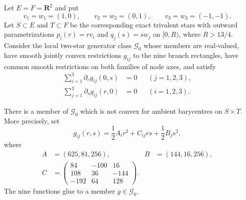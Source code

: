 
\begin{proposition}
\label{prop:p071-offcenter-convex-roof-obstruction}
Let $E=F=\mathbf R^2$ and put
\[
 v_1=w_1=(1,0),\qquad
 v_2=w_2=(0,1),\qquad
 v_3=w_3=(-1,-1).
\]
Let $S\subset E$ and $T\subset F$ be the corresponding exact trivalent
stars with outward parametrizations $p_i(r)=rv_i$ and $q_j(s)=sw_j$ on
$[0,R)$, where $R>13/4$.  Consider the local two-star generator class
$\mathcal G_0$ whose members are real-valued, have smooth jointly convex
restrictions $g_{ij}$ to the nine branch rectangles, have common smooth
restrictions on both families of node axes, and satisfy
\begin{align}
 \sum_{i=1}^3\partial_rg_{ij}(0,s)&=0
       &&(j=1,2,3),
 \label{eq:p071-offcenter-first-balance}\\
 \sum_{j=1}^3\partial_sg_{ij}(r,0)&=0
       &&(i=1,2,3).
 \label{eq:p071-offcenter-second-balance}
\end{align}

There is a member of $\mathcal G_0$ which is not convex for ambient
barycentres on $S\times T$.  More precisely, set
\begin{equation}
 g_{ij}(r,s)=\frac12A_ir^2+C_{ij}rs+\frac12B_js^2,
 \label{eq:p071-offcenter-quadratic}
\end{equation}
where
\begin{equation}
 \begin{aligned}
 A&=(625,81,256),& B&=(144,16,256),\\
 C&=\begin{pmatrix}
 84&-100&16\\
 108&36&-144\\
 -192&64&128
 \end{pmatrix}.&&
 \end{aligned}
 \label{eq:p071-offcenter-coefficients}
\end{equation}
The nine functions glue to a member $g\in\mathcal G_0$.


\end{proposition}
